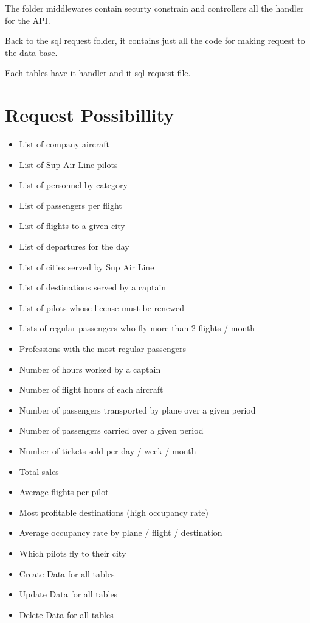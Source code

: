 \documentclass{article}
\begin{document}
    The folder middlewares contain securty constrain and controllers all the handler for the API. \newline\newline

    Back to the sql request folder, it contains just all the code for making request to the data base. \newline\newline

    Each tables have it handler and it sql request file. \newline
    
    \section{Request Possibillity}

    \begin{itemize}
        \item List of company aircraft
        \item List of Sup Air Line pilots
        \item List of personnel by category
        \item List of passengers per flight
        \item List of flights to a given city
        \item List of departures for the day
        \item List of cities served by Sup Air Line
        \item List of destinations served by a captain
        \item List of pilots whose license must be renewed
        \item Lists of regular passengers who fly more than 2 flights / month
        \item Professions with the most regular passengers
        \item Number of hours worked by a captain
        \item Number of flight hours of each aircraft
        \item Number of passengers transported by plane over a given period
        \item Number of passengers carried over a given period
        \item Number of tickets sold per day / week / month
        \item Total sales
        \item Average flights per pilot
        \item Most profitable destinations (high occupancy rate)
        \item Average occupancy rate by plane / flight / destination
        \item Which pilots fly to their city
        \item Create Data for all tables
        \item Update Data for all tables
        \item Delete Data for all tables 
    \end{itemize}
\end{document}
